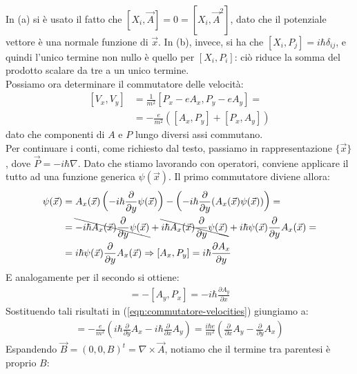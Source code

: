 \documentclass[../../FisicaTeorica.tex]{subfiles}
\begin{document}
\begin{enumerate}
\begin{align}
\end{align}
In (a) si è usato il fatto che $[X_i, \vec{A}]=0=[X_i, \vec{A}^2]$, dato che il potenziale vettore è una normale funzione di $\vec{x}$. In (b), invece, si ha che $[X_i, P_j]=i\hbar \delta_{ij}$, e quindi l'unico termine non nullo è quello per $[X_i, P_i]$: ciò riduce la somma del prodotto scalare da tre a un unico termine.\\
Possiamo ora determinare il commutatore delle velocità:
\begin{align} \nonumber
[V_x, V_y] &\underset{}{=} \frac{1}{m^2} [P_x - eA_x, P_y - eA_y]= \\\label{eqn:commutatore-velocities}
&=-\frac{e}{m^2}([A_x, P_y] + [P_x,A_y])
\end{align}
dato che componenti di $A$ e $P$ lungo diversi assi commutano.\\ Per continuare i conti, come richiesto dal testo, passiamo in rappresentazione $\{\vec{x}\}$, dove $\vec{P}=-i\hbar \nabla$. Dato che stiamo lavorando con operatori, conviene applicare il tutto ad una funzione generica $\psi(\vec{x})$. Il primo commutatore diviene allora:
\begin{align*}
[A_x, P_y]\psi(\vec{x}) &=A_x(\vec{x})\left( -i\hbar \frac{\partial}{\partial y}\psi(\vec{x})\right) - \left(-i\hbar \frac{\partial}{\partial y}(A_x(\vec{x})\psi(\vec{x}))\right)=\\
&= \bcancel{-i\hbar A_x(\vec{x})\frac{\partial}{\partial y}\psi(\vec{x})}+\bcancel{i\hbar A_x(\vec{x})\frac{\partial}{\partial y}\psi(\vec{x})} + i\hbar \psi(\vec{x})\frac{\partial}{\partial y}A_x(\vec{x})=\\
&=i\hbar\psi(\vec{x}) \frac{\partial}{\partial y}A_x(\vec{x}) \Rightarrow  [A_x,P_y] =i\hbar \frac{\partial A_x}{\partial y}
\end{align*}
E analogamente per il secondo si ottiene:
\begin{align*}
[P_x,A_y]=-[A_y,P_x] =-i\hbar\frac{\partial A_y}{\partial x}
\end{align*}
Sostituendo tali risultati in (\ref{eqn:commutatore-velocities}) giungiamo a:
\begin{align*}
[V_x, V_y] = -\frac{e}{m^2} \left(i\hbar \frac{\partial}{\partial y}A_x - i\hbar \frac{\partial}{\partial x}A_y \right)=\frac{i\hbar e}{m^2}\left(\frac{\partial}{\partial x}A_y-\frac{\partial}{\partial y} A_x\right) 
\end{align*}
Espandendo $\vec{B} = (0,0,B)^t = \nabla \times \vec{A}$, notiamo che il termine tra parentesi è proprio $B$:
\begin{align}

\end{align}
\end{enumerate}
\end{document}
